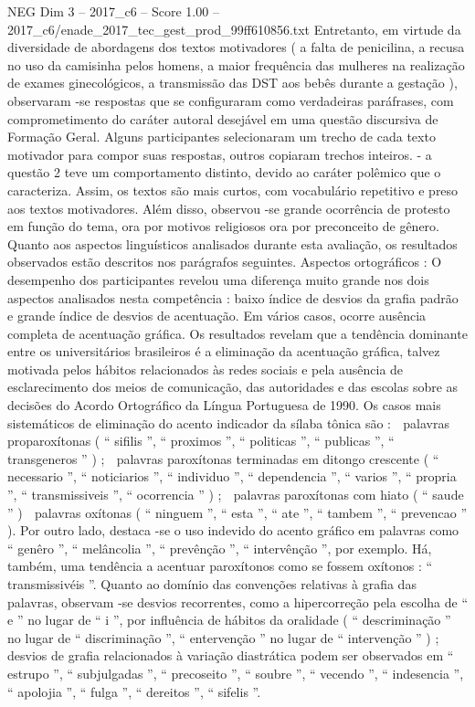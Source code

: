 \begin{textsample}{NEG Dim 3 – 2017\_c6 – Score 1.00 – 2017\_c6/enade\_2017\_tec\_gest\_prod\_99ff610856.txt}
Entretanto, em virtude da diversidade de abordagens dos textos motivadores ( a falta de penicilina, a recusa no uso da camisinha pelos homens, a maior frequência das mulheres na realização de exames ginecológicos, a transmissão das DST aos bebês durante a gestação ), observaram -se respostas que se configuraram como verdadeiras paráfrases, com comprometimento do caráter autoral desejável em uma questão discursiva de Formação Geral.
Alguns participantes selecionaram um trecho de cada texto motivador para compor suas respostas, outros copiaram trechos inteiros. - a questão 2 teve um comportamento distinto, devido ao caráter polêmico que o caracteriza.
Assim, os textos são mais curtos, com vocabulário repetitivo e preso aos textos motivadores.
Além disso, observou -se grande ocorrência de protesto em função do tema, ora por motivos religiosos ora por preconceito de gênero.
Quanto aos aspectos linguísticos analisados durante esta avaliação, os resultados observados estão descritos nos parágrafos seguintes.
Aspectos ortográficos : O desempenho dos participantes revelou uma diferença muito grande nos dois aspectos analisados nesta competência : baixo índice de desvios da grafia padrão e grande índice de desvios de acentuação.
Em vários casos, ocorre ausência completa de acentuação gráfica.
Os resultados revelam que a tendência dominante entre os universitários brasileiros é a eliminação da acentuação gráfica, talvez motivada pelos hábitos relacionados às redes sociais e pela ausência de esclarecimento dos meios de comunicação, das autoridades e das escolas sobre as decisões do Acordo Ortográfico da Língua Portuguesa de 1990.
Os casos mais sistemáticos de eliminação do acento indicador da sílaba tônica são :  palavras proparoxítonas ( “ sifilis ”, “ proximos ”, “ politicas ”, “ publicas ”, “ transgeneros ” ) ;  palavras paroxítonas terminadas em ditongo crescente ( “ necessario ”, “ noticiarios ”, “ individuo ”, “ dependencia ”, “ varios ”, “ propria ”, “ transmissiveis ”, “ ocorrencia ” ) ;  palavras paroxítonas com hiato ( “ saude ” )  palavras oxítonas ( “ ninguem ”, “ esta ”, “ ate ”, “ tambem ”, “ prevencao ” ).
Por outro lado, destaca -se o uso indevido do acento gráfico em palavras como “ genêro ”, “ melâncolia ”, “ prevênção ”, “ intervênção ”, por exemplo.
Há, também, uma tendência a acentuar paroxítonos como se fossem oxítonos : “ transmissivéis ”.
Quanto ao domínio das convenções relativas à grafia das palavras, observam -se desvios recorrentes, como a hipercorreção pela escolha de “ e ” no lugar de “ i ”, por influência de hábitos da oralidade ( “ descriminação ” no lugar de “ discriminação ”, “ entervenção ” no lugar de “ intervenção ” ) ; desvios de grafia relacionados à variação diastrática podem ser observados em “ estrupo ”, “ subjulgadas ”, “ precoseito ”, “ soubre ”, “ vecendo ”, “ indesencia ”, “ apolojia ”, “ fulga ”, “ dereitos ”, “ sifelis ”.

\end{textsample}
